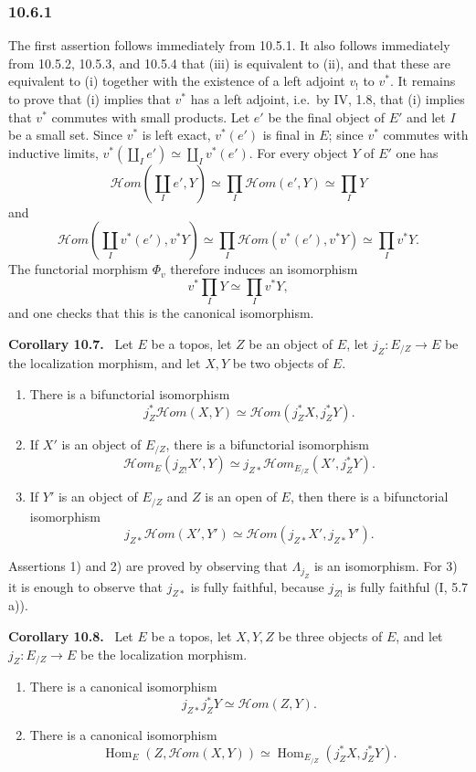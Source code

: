 \documentclass[11pt]{article}
\newcommand{\Hom}{\operatorname{Hom}}
\newcommand{\scrHom}{\mathscr{H}\!om}
\newcommand{\ie}{i.e.}
\newenvironment{statement}[1]{\par\medskip\noindent\textbf{#1.}\ }{\par\medskip}
\begin{document}
\subsubsection*{10.6.1}
The first assertion follows immediately from 10.5.1. It also follows immediately from 10.5.2, 10.5.3, and 10.5.4 that (iii) is equivalent to (ii), and that these are equivalent to (i) together with the existence of a left adjoint $v_!$ to $v^*$. It remains to prove that (i) implies that $v^*$ has a left adjoint, \ie\ by IV, 1.8, that (i) implies that $v^*$ commutes with small products. Let $e'$ be the final object of $E'$ and let $I$ be a small set. Since $v^*$ is left exact, $v^*(e')$ is final in $E$; since $v^*$ commutes with inductive limits, $v^*(\coprod_I e')\simeq\coprod_Iv^*(e')$. For every object $Y$ of $E'$ one has
\[
\scrHom(\coprod_Ie',Y)\simeq \prod_I\scrHom(e',Y)\simeq \prod_IY
\]
and
\[
\scrHom(\coprod_Iv^*(e'),v^*Y)\simeq \prod_I\scrHom(v^*(e'),v^*Y)\simeq \prod_Iv^*Y.
\]
The functorial morphism $\Phi_v$ therefore induces an isomorphism
\[
v^*\prod_IY\simeq \prod_Iv^*Y,
\]
and one checks that this is the canonical isomorphism.

\begin{statement}{Corollary 10.7}
Let $E$ be a topos, let $Z$ be an object of $E$, let $j_Z:E_{/Z}\to E$ be the localization morphism, and let $X,Y$ be two objects of $E$.
\begin{enumerate}[label=\arabic*)]
\item There is a bifunctorial isomorphism
\[
j_Z^*\scrHom(X,Y)\simeq \scrHom(j_Z^*X,j_Z^*Y).
\]
\item If $X'$ is an object of $E_{/Z}$, there is a bifunctorial isomorphism
\[
\scrHom_E(j_{Z!}X',Y)\simeq j_{Z*}\scrHom_{E_{/Z}}(X',j_Z^*Y).
\]
\item If $Y'$ is an object of $E_{/Z}$ and $Z$ is an open of $E$, then there is a bifunctorial isomorphism
\[
j_{Z*}\scrHom(X',Y')\simeq \scrHom(j_{Z*}X',j_{Z*}Y').
\]
\end{enumerate}
\end{statement}

Assertions 1) and 2) are proved by observing that $\Lambda_{j_Z}$ is an isomorphism. For 3) it is enough to observe that $j_{Z*}$ is fully faithful, because $j_{Z!}$ is fully faithful (I, 5.7 a)).

\begin{statement}{Corollary 10.8}
Let $E$ be a topos, let $X,Y,Z$ be three objects of $E$, and let $j_Z:E_{/Z}\to E$ be the localization morphism.
\begin{enumerate}[label=\arabic*)]
\item There is a canonical isomorphism
\[
j_{Z*}j_Z^*Y\simeq \scrHom(Z,Y).
\]
\item There is a canonical isomorphism
\[
\Hom_E(Z,\scrHom(X,Y))\simeq \Hom_{E_{/Z}}(j_Z^*X,j_Z^*Y).
\]
\end{enumerate}
\end{statement}
\end{document}

